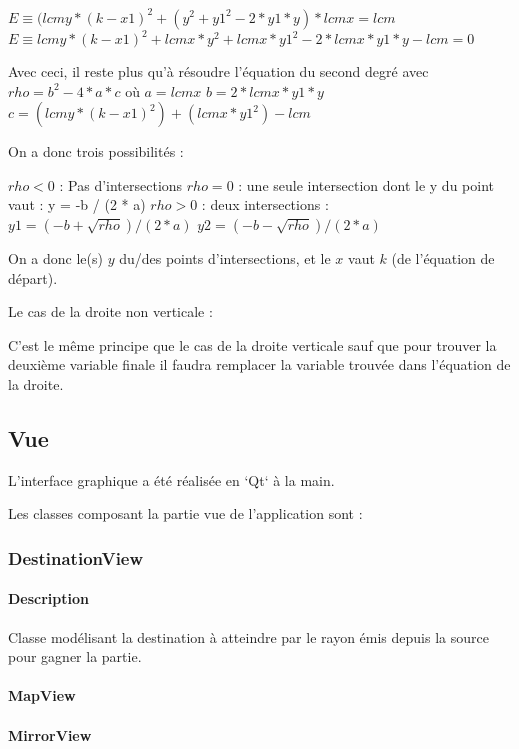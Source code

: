 \documentclass[]{article}
\begin{document}
$E \equiv (lcmy * (k-x1)^2 + (y^2 + y1^2 - 2*y1*y) * lcmx = lcm$
$E \equiv lcmy * (k-x1)^2 + lcmx*y^2 + lcmx * y1^2 - 2*lcmx*y1*y - lcm = 0$

Avec ceci, il reste plus qu'à résoudre l'équation du second degré 
avec $rho = b^2 - 4*a*c$
    où $a = lcmx$
      $b = 2*lcmx*y1*y$
      $c = (lcmy * (k-x1)^2) + (lcmx * y1^2) - lcm$


On a donc trois possibilités : 

    $rho < 0$ : Pas d'intersections
    $rho = 0$ : une seule intersection dont le y du point vaut : 
        y = -b / (2 * a)
    $rho > 0$ : deux intersections : 
        $y1 = (-b + \sqrt{rho}) / (2 * a)$
        $y2 = (-b - \sqrt{rho}) / (2 * a)$

    On a donc le(s) $y$ du/des points d'intersections, et le $x$
    vaut $k$ (de l'équation de départ).



Le cas de la droite non verticale : 


C'est le même principe que le cas de la droite verticale sauf
que pour trouver la deuxième variable finale il faudra
remplacer la variable trouvée dans l'équation de la droite.

\subsection{Vue}


L’interface graphique a été réalisée en `Qt` à la main.

Les classes composant la partie vue de l’application sont :

\subsubsection{DestinationView}

\paragraph{Description}


Classe modélisant la destination à atteindre par le rayon émis depuis la source pour gagner la partie.

\paragraph{MapView}

\paragraph{MirrorView}
\end{document}
